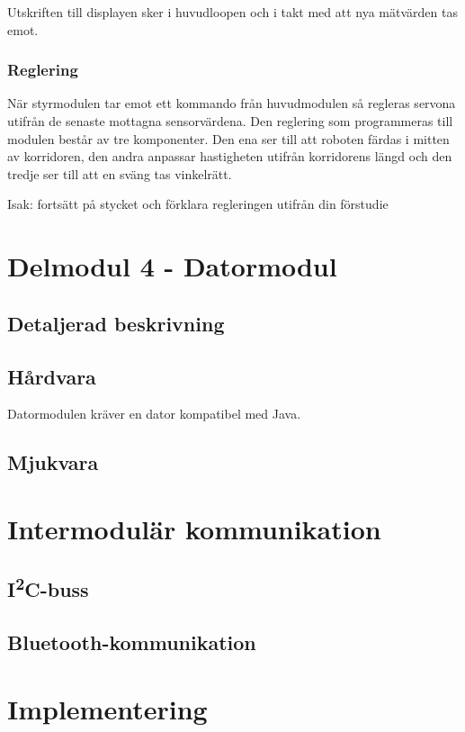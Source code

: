 \documentclass[11pt]{article}
\begin{document}
\begin{flushleft}
Utskriften till displayen sker i huvudloopen och i takt med att nya mätvärden tas emot.

\subsubsection{Reglering}
När styrmodulen tar emot ett kommando från huvudmodulen så regleras servona utifrån de senaste mottagna sensorvärdena. Den reglering som programmeras till modulen består av tre komponenter. Den ena ser till att roboten färdas i mitten av korridoren, den andra anpassar hastigheten utifrån korridorens längd och den tredje ser till att en sväng tas vinkelrätt.

Isak: fortsätt på stycket och förklara regleringen utifrån din förstudie




\pagebreak
\section{Delmodul 4 - Datormodul}
\lipsum

\subsection{Detaljerad beskrivning}
\lipsum

\subsection{Hårdvara}
Datormodulen kräver en dator kompatibel med Java.

\subsection{Mjukvara}
\lipsum

\pagebreak
\section{Intermodulär kommunikation}
\lipsum

\subsection{I\textsuperscript{2}C-buss}
\lipsum

\subsection{Bluetooth\textsuperscript{\circledR}-kommunikation}
\lipsum

\pagebreak
\section{Implementering}
\lipsum

\pagebreak
{}



\end{flushleft}
\end{document}
